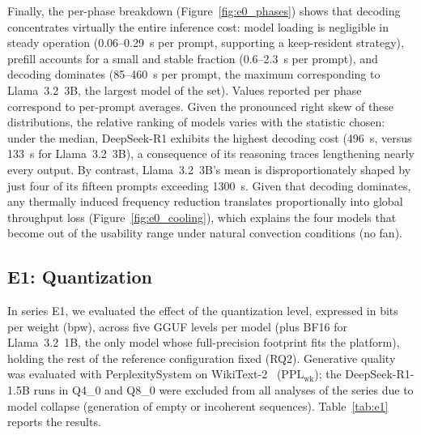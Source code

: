 \documentclass[acmsmall,natbib=false]{acmart}
\begin{document}
Finally, the per-phase breakdown (Figure~\ref{fig:e0_phases}) shows that
decoding concentrates virtually the entire inference cost: model loading is
negligible in steady operation (0.06--0.29~s per prompt, supporting a
keep-resident strategy), prefill accounts for a small and stable fraction
(0.6--2.3~s per prompt), and decoding dominates (85--460~s per prompt, the
maximum corresponding to Llama~3.2~3B, the largest model of the set).
Values reported per phase correspond to per-prompt averages.
 Given the pronounced right skew of these distributions, 
 the relative ranking of models varies with the statistic chosen:
under the median, DeepSeek-R1 exhibits the highest decoding cost (496~s, versus 133~s for Llama~3.2~3B),
a consequence of its reasoning traces lengthening nearly every output. By contrast, Llama~3.2~3B's mean is disproportionately 
shaped by just four of its fifteen prompts exceeding 1300~s. Given that decoding dominates, any
thermally induced frequency reduction translates proportionally into global
throughput loss (Figure~\ref{fig:e0_cooling}), which explains the four models that become out of the
usability range under natural convection conditions (no fan).

\subsection{E1: Quantization}\label{sec:results_e1}

In series E1, we evaluated the effect of the quantization level, expressed in bits
per weight (bpw), across five GGUF levels per model (plus BF16 for
Llama~3.2~1B, the only model whose full-precision footprint fits the
platform), holding the rest of the reference configuration fixed (RQ2).
Generative quality was evaluated with PerplexitySystem on
WikiText-2~\cite{merity2016pointer} ($\mathrm{PPL}_{\mathrm{wk}}$); the DeepSeek-R1-1.5B runs in Q4\_0 and Q8\_0
were excluded from all analyses of the series due to model collapse
(generation of empty or incoherent sequences). Table~\ref{tab:e1} reports the results.
\end{document}
